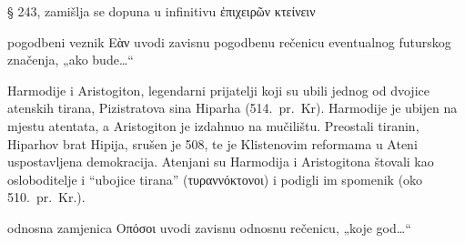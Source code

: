 \begin{description}[noitemsep]
\item[ἐπιχειρῶν] § 243, zamišlja se dopuna u infinitivu ἐπιχειρῶν κτείνειν
\item[Εὰν δέ… ἀποθάνῃ] pogodbeni veznik Εὰν uvodi zavisnu pogodbenu rečenicu eventualnog futurskog značenja, „ako bude…“
\item[Ἁρμόδιόν τε καὶ Ἀριστογείτονα] Harmodije i Aristogiton, legendarni prijatelji koji su ubili jednog od dvojice atenskih tirana, Pizistratova sina Hiparha (514.\ pr.~Kr). Harmodije je ubijen na mjestu atentata, a Aristogiton je izdahnuo na mučilištu. Preostali tiranin, Hiparhov brat Hipija, srušen je 508, te je Klistenovim reformama u Ateni uspostavljena demokracija. Atenjani su Harmodija i Aristogitona štovali kao osloboditelje i ``ubojice tirana'' \textgreek[variant=ancient]{(τυραννόκτονοι)} i podigli im spomenik (oko 510.\ pr.~Kr.).
\end{description}



\begin{description}[noitemsep]
\item[Οπόσοι… ὀμώμονται] odnosna zamjenica Οπόσοι uvodi zavisnu odnosnu rečenicu, „koje god…“
\end{description}


